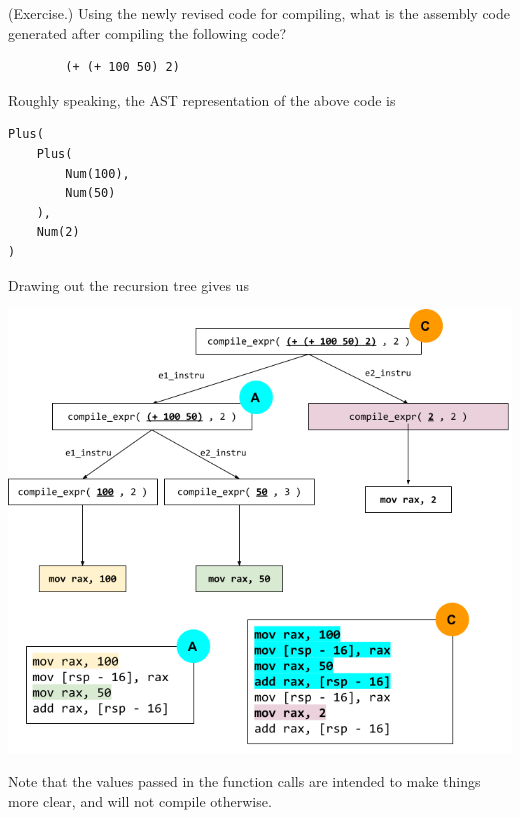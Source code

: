 \documentclass[letterpaper]{article}
\begin{document}
\begin{mdframed}
    (Exercise.) Using the newly revised code for compiling, what is the assembly code generated after compiling the following code?
    \begin{verbatim}
        (+ (+ 100 50) 2)\end{verbatim}

    \begin{mdframed}
        Roughly speaking, the AST representation of the above code is 
        \begin{verbatim}
Plus(
    Plus(
        Num(100),
        Num(50)
    ),
    Num(2)
)\end{verbatim}

        Drawing out the recursion tree gives us 
        \begin{center}
            \includegraphics[scale=0.57]{../assets/add_asm.png}
        \end{center}
        Note that the values passed in the function calls are intended to make things more clear, and will not compile otherwise. 
    \end{mdframed}
\end{mdframed}

\bigskip 
\end{document}
